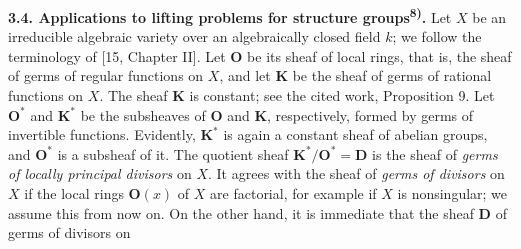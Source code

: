 \indent\textbf{3.4. Applications to lifting problems for structure
groups\textsuperscript{8)}.} Let $X$ be an irreducible algebraic variety over
an algebraically closed field $k$; we follow the terminology of [15,
Chapter II]. Let $\mathbf O$ be its sheaf of local rings, that is, the sheaf
of germs of regular functions on $X$, and let $\mathbf K$ be the sheaf of
germs of rational functions on $X$. The sheaf $\mathbf K$ is constant; see
the cited work, Proposition 9. Let $\mathbf O^*$ and $\mathbf K^*$ be the
subsheaves of $\mathbf O$ and $\mathbf K$, respectively, formed by germs of
invertible functions. Evidently, $\mathbf K^*$ is again a constant sheaf of
abelian groups, and $\mathbf O^*$ is a subsheaf of it.
The quotient sheaf $\mathbf K^*/\mathbf O^*=\mathbf D$ is the sheaf of
\textit{germs of locally principal divisors} on $X$. It agrees with the sheaf
of \textit{germs of divisors} on $X$ if the local rings $\mathbf O(x)$ of
$X$ are factorial, for example if $X$ is nonsingular; we assume this from
now on. On the other hand, it is immediate that the sheaf $\mathbf D$ of
germs of divisors on



